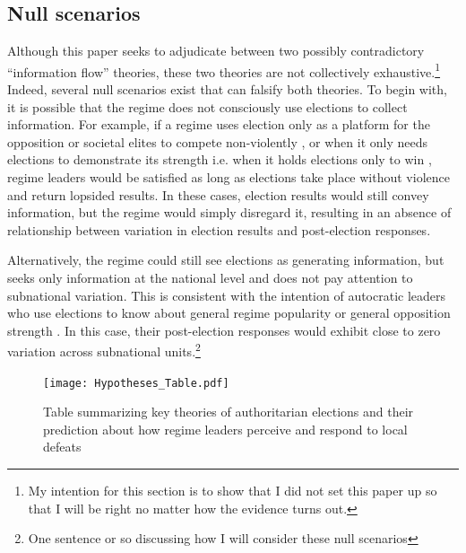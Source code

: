 \documentclass[12pt]{article}\usepackage[]{graphicx}\usepackage[]{color}
\newcommand{\1}{\mathbbm{1}}
\begin{document}
\subsection{Null scenarios}

Although this paper seeks to adjudicate between two possibly contradictory ``information flow'' theories, these two theories are not collectively exhaustive.\footnote{My intention for this section is to show that I did not set this paper up so that I will be right no matter how the evidence turns out.} Indeed, several null scenarios exist that can falsify both theories. To begin with, it is possible that the regime does not consciously use elections to collect information. For example, if a regime uses election only as a platform for the opposition or societal elites to compete non-violently \citep{AR2005, Cox2009, LustOkar2006}, or when it only needs elections to demonstrate its strength i.e. when it holds elections only to win \citep{Geddes2005, Simpser2013}, regime leaders would be satisfied as long as elections take place without violence and return lopsided results. In these cases, election results would still convey information, but the regime would simply disregard it, resulting in an absence of relationship between variation in election results and post-election responses.

Alternatively, the regime could still see elections as generating information, but seeks only information at the national level and does not pay attention to subnational variation. This is consistent with the intention of autocratic leaders who use elections to know about general regime popularity \citep{Miller2015} or general opposition strength \citep{Geddes2005}. In this case, their post-election responses would exhibit close to zero variation across subnational units.\footnote{One sentence or so discussing how I will consider these null scenarios}

\begin{landscape}
	\begin{figure}[h]
		\begin{centering}
				\texttt{[image: Hypotheses\_Table.pdf]}
		\end{centering}
		\caption{Table summarizing key theories of authoritarian elections and their prediction about how regime leaders perceive and respond to local defeats}
	\end{figure}
\end{landscape}
\end{document}
